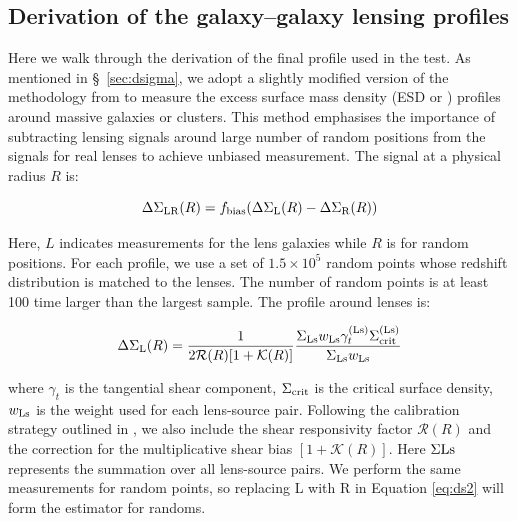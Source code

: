 \documentclass[fleqn,usenatbib,useAMS]{mnras}
\begin{document}
\begin{CJK*}{UTF8}{gbsn}




\appendix

\section{Derivation of the galaxy--galaxy lensing profiles}
    \label{app:dsigma_detail}

    Here we walk through the derivation of the final \dsigma{} profile used in the \topn{} test.
    As mentioned in \S\ \ref{sec:dsigma}, we adopt a slightly modified version of the methodology
    from \citet{Singh2017} to measure the excess surface mass density (ESD or \dsigma{}) profiles
    around massive galaxies or clusters.
    This method emphasises the importance of subtracting lensing signals around large number of
    random positions from the signals for real lenses to achieve unbiased measurement.
    The \dsigma{} signal at a physical radius $R$ is:

    \begin{equation}
        {\Delta\Sigma}_{\rm LR}(R) =
        f_{\rm bias}({\Delta\Sigma}_{\mathrm{L}}(R) - {\Delta\Sigma}_{\mathrm{R}}(R))
        \label{eq:ds1}
    \end{equation}

    Here, $L$ indicates measurements for the lens galaxies while $R$ is for random positions.
    For each \dsigma{} profile, we use a set of $1.5 \times 10^5$ random points whose redshift
    distribution is matched to the lenses.
    The number of random points is at least 100 time larger than the largest \topn{} sample.
    The \dsigma{} profile around lenses is:

    \begin{equation}
        {\Delta\Sigma}_{\rm L}(R) = \frac{1}{2 \mathcal{R}(R) [1+\mathcal{K}(R)]}
            \frac{\Sigma_{\rm Ls} w_{\rm Ls} \gamma_{t}^{(\rm Ls)}
            \Sigma_{\rm crit}^{(\rm Ls)}}{\Sigma_{\rm Ls} w_{\rm Ls}}
        \label{eq:ds2}
    \end{equation}

    \noindent where $\gamma_{t}$ is the tangential shear component, $\Sigma_{\rm crit}$ is the
    critical surface density, $w_{\rm Ls}$ is the weight used for each lens-source pair.
    Following the calibration strategy outlined in \citet{HSC-WLCALIB}, we also include
    the shear responsivity factor $\mathcal{R}(R)$ and the correction for the multiplicative
    shear bias $[1+\mathcal{K}(R)]$.
    Here $\Sigma{\rm Ls}$ represents the summation over all lens-source pairs.
    We perform the same measurements for random points, so replacing L with R in
    Equation \ref{eq:ds2} will form the estimator for randoms.


\end{CJK*}
\end{document}

